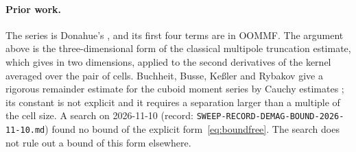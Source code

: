 \documentclass[11pt]{amsart}
\theoremstyle{plain}
\theoremstyle{definition}
\theoremstyle{remark}
\begin{document}
\paragraph{Prior work.}
The series is Donahue's \cite{Donahue2007}, and its first four terms are in
OOMMF. The argument above is the three-dimensional form of the classical
multipole truncation estimate, which \cite{GR1987} gives in two dimensions,
applied to the second derivatives of the kernel averaged over the pair of cells. Buchheit, Busse, Ke\ss ler and Rybakov give a rigorous remainder estimate
for the cuboid moment series by Cauchy estimates
\cite[Corollary~2.5]{BBKR2026}; its constant is not explicit and it requires a
separation larger than a multiple of the cell size. A search on 2026-11-10
(record: \texttt{SWEEP-RECORD-DEMAG-BOUND-2026-11-10.md}) found no bound of the
explicit form~\eqref{eq:boundfree}. The search does not rule out a bound of this
form elsewhere.
\end{document}
